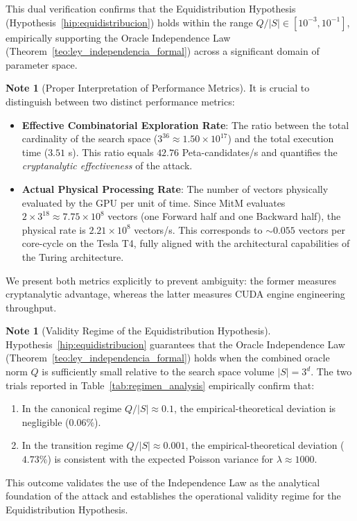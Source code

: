 \documentclass[11pt,a4paper]{article}
\theoremstyle{plain}
\theoremstyle{definition}
\newtheorem{remark}[teorema]{Note}
\numberwithin{equation}{section}
\begin{document}
This dual verification confirms that the Equidistribution Hypothesis (Hypothesis~\ref{hip:equidistribucion}) holds within the range $Q/|S| \in [10^{-3}, 10^{-1}]$, empirically supporting the Oracle Independence Law (Theorem~\ref{teo:ley_independencia_formal}) across a significant domain of parameter space.

\begin{remark}[Proper Interpretation of Performance Metrics]
\label{rem:metrica_rendimiento}
It is crucial to distinguish between two distinct performance metrics:
\begin{itemize}
    \item \textbf{Effective Combinatorial Exploration Rate}: The ratio between the total cardinality of the search space ($3^{36} \approx 1.50 \times 10^{17}$) and the total execution time ($3.51$ s). This ratio equals $42.76$ Peta-candidates/s and quantifies the \emph{cryptanalytic effectiveness} of the attack.
    \item \textbf{Actual Physical Processing Rate}: The number of vectors physically evaluated by the GPU per unit of time. Since MitM evaluates $2 \times 3^{18} \approx 7.75 \times 10^8$ vectors (one Forward half and one Backward half), the physical rate is $2.21 \times 10^8$ vectors/s. This corresponds to $\sim 0.055$ vectors per core-cycle on the Tesla T4, fully aligned with the architectural capabilities of the Turing architecture.
\end{itemize}
We present both metrics explicitly to prevent ambiguity: the former measures cryptanalytic advantage, whereas the latter measures CUDA engine engineering throughput.
\end{remark}

\begin{remark}[Validity Regime of the Equidistribution Hypothesis]
\label{rem:regimen_validez}
Hypothesis~\ref{hip:equidistribucion} guarantees that the Oracle Independence Law (Theorem~\ref{teo:ley_independencia_formal}) holds when the combined oracle norm $Q$ is sufficiently small relative to the search space volume $|S| = 3^d$. The two trials reported in Table~\ref{tab:regimen_analysis} empirically confirm that:
\begin{enumerate}
    \item In the canonical regime $Q/|S| \approx 0.1$, the empirical-theoretical deviation is negligible ($0.06\%$).
    \item In the transition regime $Q/|S| \approx 0.001$, the empirical-theoretical deviation ($4.73\%$) is consistent with the expected Poisson variance for $\lambda \approx 1000$.
\end{enumerate}
This outcome validates the use of the Independence Law as the analytical foundation of the attack and establishes the operational validity regime for the Equidistribution Hypothesis.
\end{remark}
\end{document}
